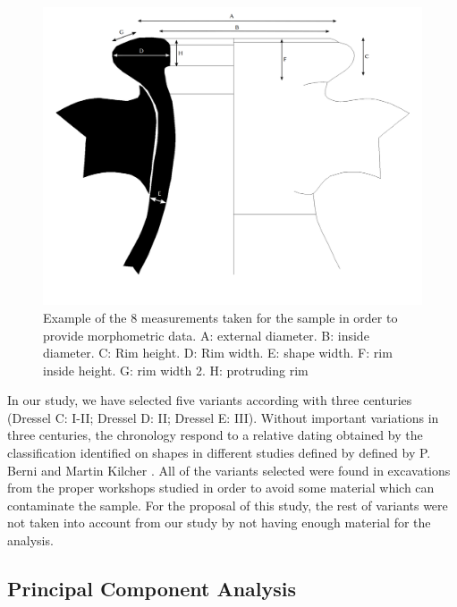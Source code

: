 \documentclass[review]{elsarticle}
\begin{document}
\begin{figure}[htp]
	\centering
\includegraphics[scale=0.10]{mesures.png}
\caption{Example of the 8 measurements taken for the sample in order to provide morphometric data. A: external diameter. B: inside diameter. C: Rim height. D: Rim width. E: shape width. F: rim inside height. G: rim width 2. H: protruding rim}
\label{mesures}
\end{figure} 

In our study, we have selected five variants according with three centuries
(Dressel C: I-II; Dressel D: II; Dressel E: III). Without important variations in three centuries, the chronology respond to a relative dating obtained by the classification identified on shapes in different studies defined by defined by P. Berni \citep{berni_millet_epigrafianforica_2008} and Martin Kilcher \citep{martin-kilcher_romischen_1994}. All of the variants selected were found in excavations from the proper workshops studied in order to avoid some material which can contaminate the sample. For the proposal of this study, the rest of variants were not taken into account from our study by not having enough material for the analysis. 


\subsection{Principal Component Analysis}
\end{document}
